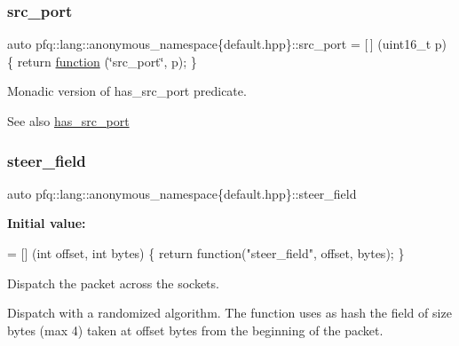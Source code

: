\subsubsection{\texorpdfstring{src\+\_\+port}{src\_port}}
{\footnotesize\ttfamily auto pfq\+::lang\+::anonymous\+\_\+namespace\{default.\+hpp\}\+::src\+\_\+port = \mbox{[}$\,$\mbox{]} (uint16\+\_\+t p) \{ return \hyperlink{namespacepfq_1_1lang_a1a4638059d700ae08d0ca63886ff2bb3}{function} (\char`\"{}src\+\_\+port\char`\"{}, p); \}}



Monadic version of {\ttfamily has\+\_\+src\+\_\+port} predicate. 

\begin{DoxySeeAlso}{See also}
\hyperlink{namespacepfq_1_1lang_1_1anonymous__namespace_02default_8hpp_03_a964d5ed41f50a1f3a04176f8e54d7a5a}{has\+\_\+src\+\_\+port} 
\end{DoxySeeAlso}
\mbox{\label{namespacepfq_1_1lang_1_1anonymous__namespace_02default_8hpp_03_ad861e297a10876e534c5c9053ec23999}} 
\subsubsection{\texorpdfstring{steer\+\_\+field}{steer\_field}}
{\footnotesize\ttfamily auto pfq\+::lang\+::anonymous\+\_\+namespace\{default.\+hpp\}\+::steer\+\_\+field}

{\bfseries Initial value\+:}
\begin{DoxyCode}
= [] (\textcolor{keywordtype}{int} offset, \textcolor{keywordtype}{int} bytes) \{
                                \textcolor{keywordflow}{return} \textcolor{keyword}{function}(\textcolor{stringliteral}{"steer\_field"}, offset, bytes);
                           \}
\end{DoxyCode}


Dispatch the packet across the sockets. 

Dispatch with a randomized algorithm. The function uses as {\ttfamily hash} the field of {\ttfamily size} bytes (max 4) taken at {\ttfamily offset} bytes from the beginning of the packet. \mbox{\label{namespacepfq_1_1lang_1_1anonymous__namespace_02default_8hpp_03_a422c7bafe8240549d193903890f9ec48}} 
